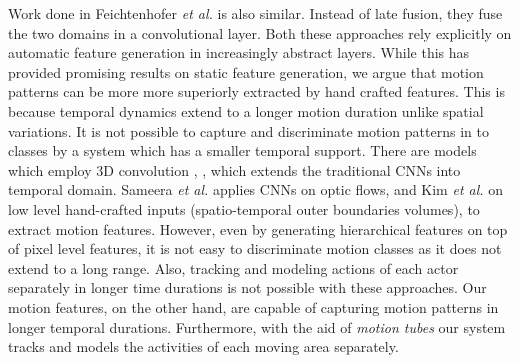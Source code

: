 Work done in Feichtenhofer \textit{et al.}\cite{feichtenhofer2016convolutional} is also similar. Instead of late fusion, 
they fuse the two domains in a convolutional layer. Both these approaches rely explicitly on automatic feature 
generation in increasingly abstract layers. While this has provided promising results on static feature generation,
we argue that motion patterns can be more more superiorly extracted by hand crafted features. This is because
temporal dynamics extend to a longer motion duration unlike spatial variations. It is not possible 
to capture and discriminate motion patterns in to classes by a system which has a smaller temporal support. There are models
which employ 3D convolution \cite{ji20133d}, \cite{tran2015learning}, which extends the traditional CNNs into temporal domain. 
Sameera \textit{et al.}\cite{7486474} applies CNNs on optic flows, and Kim \textit{et al.}\cite{kim2007human} on low level hand-crafted inputs 
(spatio-temporal outer boundaries volumes), to extract motion features. However, even by generating hierarchical 
features on top of pixel level features, it is not easy to discriminate motion classes as it does not extend to a long range. 
Also, tracking and modeling actions of each actor separately in longer time durations is not possible with these 
approaches. Our motion features, on the other hand, are capable of capturing motion patterns in longer temporal durations.
Furthermore, with the aid of \textit{motion tubes} our system tracks and models the activities of each moving area separately. 

